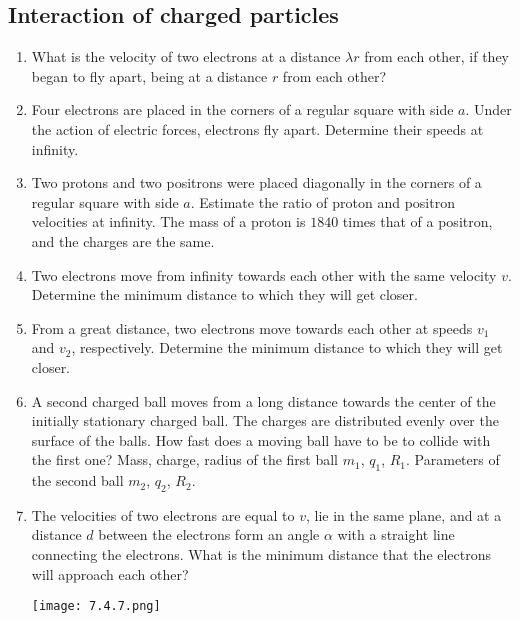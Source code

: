 \documentclass{article}
\begin{document}
\subsection{Interaction of charged particles}
\begin{enumerate}[label=7.4.\arabic*]

\item What is the velocity of two electrons at a distance $\lambda r$ from each other, if they began to fly apart, being at a distance $r$ from each other?

\item Four electrons are placed in the corners of a regular square with side $a$. Under the action of electric forces, electrons fly apart. Determine their speeds at infinity.

\item Two protons and two positrons were placed diagonally in the corners of a regular square with side $a$. Estimate the ratio of proton and positron velocities at infinity. The mass of a proton is $1840$ times that of a positron, and the charges are the same.

\item Two electrons move from infinity towards each other with the same velocity $v$. Determine the minimum distance to which they will get closer.

\item From a great distance, two electrons move towards each other at speeds $v_1$ and $v_2$, respectively. Determine the minimum distance to which they will get closer.

\item A second charged ball moves from a long distance towards the center of the initially stationary charged ball. The charges are distributed evenly over the surface of the balls. How fast does a moving ball have to be to collide with the first one? Mass, charge, radius of the first ball $m_1$, $q_1$, $R_1$. Parameters of the second ball $m_2$, $q_2$, $R_2$.

\item The velocities of two electrons are equal to $v$, lie in the same plane, and at a distance $d$ between the electrons form an angle $\alpha$ with a straight line connecting the electrons. What is the minimum distance that the electrons will approach each other?

\begin{center}
    \texttt{[image: 7.4.7.png]}
\end{center}



\end{enumerate}
\end{document}
